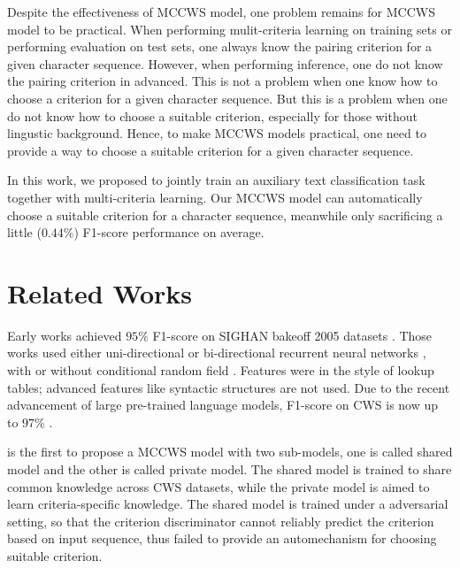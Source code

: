 \documentclass[11pt]{article}
\begin{document}
Despite the effectiveness of MCCWS model, one problem remains for MCCWS model to be practical.
When performing mulit-criteria learning on training sets or performing evaluation on test sets, one always know the pairing criterion for a given character sequence.
However, when performing inference, one do not know the pairing criterion in advanced.
This is not a problem when one know how to choose a criterion for a given character sequence.
But this is a problem when one do not know how to choose a suitable criterion, especially for those without lingustic background.
Hence, to make MCCWS models practical, one need to provide a way to choose a suitable criterion for a given character sequence.

In this work, we proposed to jointly train an auxiliary text classification task together with multi-criteria learning.
Our MCCWS model can automatically choose a suitable criterion for a character sequence, meanwhile only sacrificing a little (\(0.44\%\)) F1-score performance on average.

\section{Related Works}\label{sec:related}

Early works achieved \(95\%\) F1-score on SIGHAN bakeoff 2005 datasets \citep{emerson-2005-second}.
Those works used either uni-directional or bi-directional recurrent neural networks \citep{Schuster-1997-bidirectional,graves-2005-framewise}, with or without conditional random field \citep{chen-etal-2017-adversarial,ma-etal-2018-state,He-2019-effective}.
Features were in the style of lookup tables;
advanced features like syntactic structures are not used.
Due to the recent advancement of large pre-trained language models, F1-score on CWS is now up to \(97\%\) \citep{huang-etal-2020-towards,huang-etal-2020-joint-multiple,ke2020unified,qiu-etal-2020-concise,ke-etal-2021-pre,tong-etal-2022-word}.

\citep{chen-etal-2017-adversarial} is the first to propose a MCCWS model with two sub-models, one is called shared model and the other is called private model.
The shared model is trained to share common knowledge across CWS datasets, while the private model is aimed to learn criteria-specific knowledge.
The shared model is trained under a adversarial setting, so that the criterion discriminator cannot reliably predict the criterion based on input sequence, thus failed to provide an automechanism for choosing suitable criterion.
\end{document}
